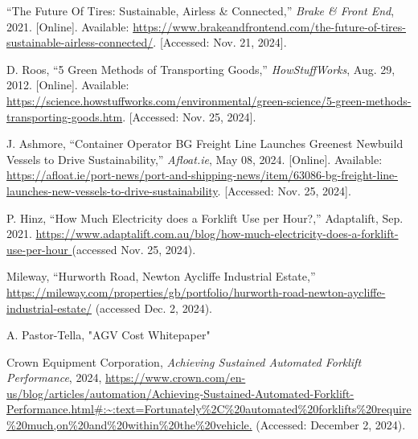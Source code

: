 \documentclass[12pt]{article}
\begin{document}
\begin{thebibliography}{99}
 ``The Future Of Tires: Sustainable, Airless \& Connected,'' \textit{Brake \& Front End}, 2021. [Online]. Available: \url{https://www.brakeandfrontend.com/the-future-of-tires-sustainable-airless-connected/}. [Accessed: Nov. 21, 2024].


 D. Roos, ``5 Green Methods of Transporting Goods,'' \textit{HowStuffWorks}, Aug. 29, 2012. [Online]. Available: \url{https://science.howstuffworks.com/environmental/green-science/5-green-methods-transporting-goods.htm}. [Accessed: Nov. 25, 2024].

 J. Ashmore, ``Container Operator BG Freight Line Launches Greenest Newbuild Vessels to Drive Sustainability,'' \textit{Afloat.ie}, May 08, 2024. [Online]. Available: \url{https://afloat.ie/port-news/port-and-shipping-news/item/63086-bg-freight-line-launches-new-vessels-to-drive-sustainability}. [Accessed: Nov. 25, 2024].


P. Hinz, “How Much Electricity does a Forklift Use per Hour?,” Adaptalift, Sep. 2021. \url{https://www.adaptalift.com.au/blog/how-much-electricity-does-a-forklift-use-per-hour }(accessed Nov. 25, 2024).

Mileway, “Hurworth Road, Newton Aycliffe Industrial Estate,” \url{https://mileway.com/properties/gb/portfolio/hurworth-road-newton-aycliffe-industrial-estate/} (accessed Dec. 2, 2024).

A. Pastor-Tella, "AGV Cost Whitepaper" 




Crown Equipment Corporation, \textit{Achieving Sustained Automated Forklift Performance}, 2024, \url{https://www.crown.com/en-us/blog/articles/automation/Achieving-Sustained-Automated-Forklift-Performance.html#:~:text=Fortunately%2C%20automated%20forklifts%20require%20much,on%20and%20within%20the%20vehicle.} (Accessed: December 2, 2024).



 

\end{thebibliography}
 
\end{document}
